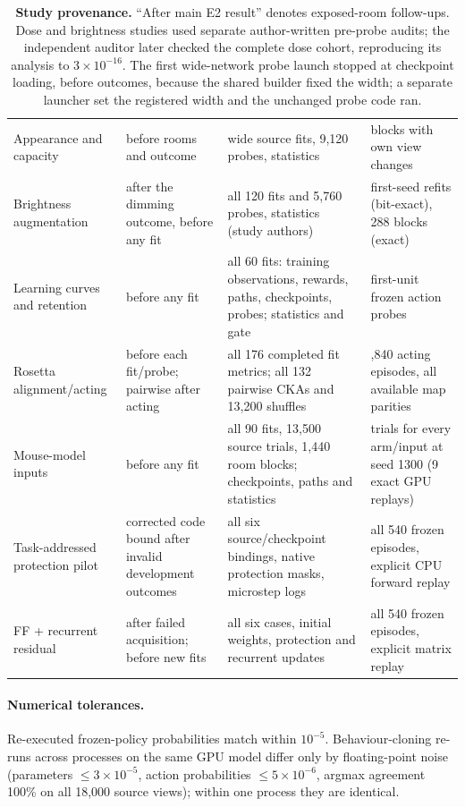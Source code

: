 \documentclass[10pt,onecolumn,letterpaper]{article}
\begin{document}
\begin{table}[h]
\begin{tabularx}{\linewidth}{>{\raggedright\arraybackslash}p{3.4cm}>{\raggedright\arraybackslash}p{2.6cm}>{\raggedright\arraybackslash}X>{\raggedright\arraybackslash}p{3.3cm}}
Appearance and capacity & before rooms and outcome & 30 wide source fits, 9,120 probes, statistics & 432 blocks with own view changes\\
Brightness augmentation & after the dimming outcome, before any fit & all 120 fits and 5,760 probes, statistics (study authors) & 6 first-seed refits (bit-exact), 288 blocks (exact)\\
Learning curves and retention & before any fit & all 60 fits: training observations, rewards, paths, checkpoints, probes; statistics and gate & first-unit frozen action probes\\
Rosetta alignment/acting & before each fit/probe; pairwise after acting & all 176 completed fit metrics; all 132 pairwise CKAs and 13,200 shuffles & 75,840 acting episodes, all available map parities\\
Mouse-model inputs & before any fit & all 90 fits, 13,500 source trials, 1,440 room blocks; checkpoints, paths and statistics & 2 trials for every arm/input at seed 1300 (9 exact GPU replays)\\
Task-addressed protection pilot & corrected code bound after invalid development outcomes & all six source/checkpoint bindings, native protection masks, microstep logs & all 540 frozen episodes, explicit CPU forward replay\\
FF + recurrent residual & after failed acquisition; before new fits & all six cases, initial weights, protection and recurrent updates & all 540 frozen episodes, explicit matrix replay\\
\bottomrule
\end{tabularx}
\caption{\textbf{Study provenance.} ``After main E2 result'' denotes exposed-room follow-ups.
Dose and brightness studies used separate author-written pre-probe audits; the independent auditor later
checked the complete dose cohort, reproducing its analysis to $3\times10^{-16}$.
The first wide-network probe launch stopped at checkpoint loading, before outcomes, because the shared builder
fixed the width; a separate launcher set the registered width and the unchanged probe code ran.}
\label{tab:prov}
\end{table}

\paragraph{Numerical tolerances.} Re-executed frozen-policy probabilities match within $10^{-5}$. Behaviour-cloning
re-runs across processes on the same GPU model differ only by floating-point noise (parameters $\leq3\times10^{-5}$,
action probabilities $\leq5\times10^{-6}$, argmax agreement 100\% on all 18,000 source views); within one process they
are identical.
\end{document}
